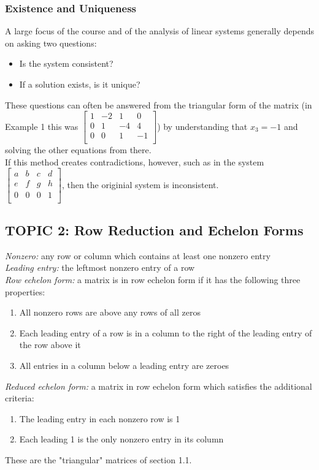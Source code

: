 \documentclass[12pt]{article} %
\begin{document}
\subsubsection{Existence and Uniqueness}
A large focus of the course and of the analysis of linear systems generally depends on asking two questions:
\begin{itemize}
	\item Is the system consistent?
	\item If a solution exists, is it unique?
\end{itemize}
These questions can often be answered from the triangular form of the matrix (in Example 1 this was $\begin{bmatrix}1 & -2 & 1 & 0\\ 0 & 1 & -4 & 4\\0 & 0 & 1 & -1\\ \end{bmatrix}$) by understanding that $x_3 = -1$ and solving the other equations from there. \\
If this method creates contradictions, however, such as in the system $\begin{bmatrix}a & b & c & d\\ e & f & g & h\\0 & 0 & 0 & 1\\ \end{bmatrix}$, then the originial system is inconsistent. \\

\pagebreak
\subsection{TOPIC 2: Row Reduction and Echelon Forms}
\emph{Nonzero:} any row or column which contains at least one nonzero entry\\

\emph{Leading entry:} the leftmost nonzero entry of a row\\

\emph{Row echelon form:} a matrix is in row echelon form if it has the following three properties:
\begin{enumerate}
	\item All nonzero rows are above any rows of all zeros
	\item Each leading entry of a row is in a column to the right of the leading entry of the row above it
	\item All entries in a column below a leading entry are zeroes
\end{enumerate}
\emph{Reduced echelon form:} a matrix in row echelon form which satisfies the additional criteria:
\begin{enumerate}
\addtocounter{enumi}{3}
\item The leading entry in each nonzero row is 1
\item Each leading 1 is the only nonzero entry in its column
\end{enumerate}
These are the "triangular" matrices of section 1.1.\\
\end{document}
